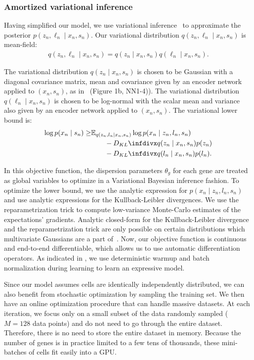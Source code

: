 \subsubsection{Amortized variational inference}
Having simplified our model, we use variational inference~\cite{blei2017variational} to approximate
the posterior $p(z_n, \ell_n \mid x_n, s_n)$. Our variational distribution $q(z_n, \ell_n \mid x_n, s_n)$ is mean-field:
\begin{align}
    q(z_n, \ell_n \mid x_n, s_n) = q(z_n \mid x_n, s_n)q(\ell_n \mid x_n, s_n).
\end{align}

The variational distribution $q(z_n \mid x_n, s_n)$ is chosen to be Gaussian with a diagonal covariance matrix, mean
and covariance given by an encoder network applied to $(x_n, s_n)$, as in~\cite{kingma2013} (Figure 1b, NN1-4)). The variational distribution $q(\ell_n \mid x_n, s_n)$ is chosen to be log-normal with the scalar mean and variance also given by an encoder network applied to $(x_n, s_n)$. The variational lower bound is:
\begin{equation}\label{scvivar_bound}
\begin{split}
\log p(x_n \mid s_n) \geq & \mathbb{E}_{q(z_n, l_n\mid x_n, s_n)}\log p(x_n\mid z_n, l_n, s_n)  \\
& \qquad- \kld{q(z_n\mid x_n, s_n)}{p(z_n)} \\
& \qquad - \kld{q(l_n\mid x_n, s_n)}{p(l_n)}.
\end{split}
\end{equation}

In this objective function, the dispersion parameters $\theta_g$ for each gene  are treated as global variables to optimize in a Variational Bayesian inference fashion. To optimize the lower bound, we use the analytic expression for $p(x_n\mid z_n, l_n, s_n)$ and use analytic expressions for the Kullback-Leibler divergences. We use the reparametrization trick to compute low-variance Monte-Carlo estimates of the expectations' gradients. Analytic closed-form for the Kullback-Leibler divergence and the reparametrization trick are only possible on certain distributions which multivariate Gaussians are a part of~\cite{kingma2013}. Now, our objective function is continuous and end-to-end differentiable, which allows us to use automatic differentiation operators. As indicated in \cite{Sønderby2016}, we use deterministic warmup and batch normalization during learning to learn an expressive model.

Since our model assumes cells are identically independently distributed, we can also benefit from stochastic optimization by sampling the training set. We then have an online optimization procedure that can handle massive datasets. At each iteration, we focus only on a small subset of the data randomly sampled ($M = 128$ data points) and do not need to go through the entire dataset. Therefore, there is no need to store the entire dataset in memory. Because the number of genes is  in practice limited to a few tens of thousands, these mini-batches of cells fit easily into a GPU.

